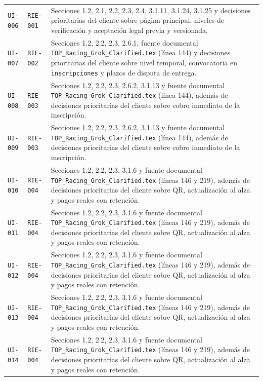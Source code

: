 \documentclass[10pt,letterpaper]{article}
\begin{document}
\begin{landscape}
\begin{longtable}{P{2.7cm}P{2.6cm}P{15.7cm}}
\texttt{UI-006} & \texttt{RIE-001} & Secciones 1.2, 2.1, 2.2, 2.3, 2.4, 3.1.11, 3.1.24, 3.1.25 y decisiones prioritarias del cliente sobre página principal, niveles de verificación y aceptación legal previa y versionada.\\
\texttt{UI-007} & \texttt{RIE-002} & Secciones 1.2, 2.2, 2.3, 2.6.1, fuente documental \texttt{TOP\_Racing\_Grok\_Clarified.tex} (línea 144) y decisiones prioritarias del cliente sobre nivel temporal, convocatoria en \texttt{inscripciones} y plazos de disputa de entrega.\\
\texttt{UI-008} & \texttt{RIE-003} & Secciones 1.2, 2.2, 2.3, 2.6.2, 3.1.13 y fuente documental \texttt{TOP\_Racing\_Grok\_Clarified.tex} (línea 144), además de decisiones prioritarias del cliente sobre cobro inmediato de la inscripción.\\
\texttt{UI-009} & \texttt{RIE-003} & Secciones 1.2, 2.2, 2.3, 2.6.2, 3.1.13 y fuente documental \texttt{TOP\_Racing\_Grok\_Clarified.tex} (línea 144), además de decisiones prioritarias del cliente sobre cobro inmediato de la inscripción.\\
\texttt{UI-010} & \texttt{RIE-004} & Secciones 1.2, 2.2, 2.3, 3.1.6 y fuente documental \texttt{TOP\_Racing\_Grok\_Clarified.tex} (líneas 146 y 219), además de decisiones prioritarias del cliente sobre QR, actualización al alza y pagos reales con retención.\\
\texttt{UI-011} & \texttt{RIE-004} & Secciones 1.2, 2.2, 2.3, 3.1.6 y fuente documental \texttt{TOP\_Racing\_Grok\_Clarified.tex} (líneas 146 y 219), además de decisiones prioritarias del cliente sobre QR, actualización al alza y pagos reales con retención.\\
\texttt{UI-012} & \texttt{RIE-004} & Secciones 1.2, 2.2, 2.3, 3.1.6 y fuente documental \texttt{TOP\_Racing\_Grok\_Clarified.tex} (líneas 146 y 219), además de decisiones prioritarias del cliente sobre QR, actualización al alza y pagos reales con retención.\\
\texttt{UI-013} & \texttt{RIE-004} & Secciones 1.2, 2.2, 2.3, 3.1.6 y fuente documental \texttt{TOP\_Racing\_Grok\_Clarified.tex} (líneas 146 y 219), además de decisiones prioritarias del cliente sobre QR, actualización al alza y pagos reales con retención.\\
\texttt{UI-014} & \texttt{RIE-004} & Secciones 1.2, 2.2, 2.3, 3.1.6 y fuente documental \texttt{TOP\_Racing\_Grok\_Clarified.tex} (líneas 146 y 219), además de decisiones prioritarias del cliente sobre QR, actualización al alza y pagos reales con retención.\\

\end{longtable}
\end{landscape}
\end{document}

